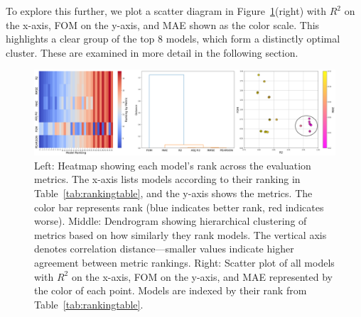 \documentclass[12pt]{article}
\begin{document}
To explore this further, we plot a scatter diagram in Figure~\ref{fig:CV_sidebyside}(right) with \(R^2\) on the x-axis, FOM on the y-axis, and MAE shown as the color scale. This highlights a clear group of the top 8 models, which form a distinctly optimal cluster. These are examined in more detail in the following section.
\begin{figure}[H]
    \centering
    \includegraphics[width=\textwidth]{LatexPlots/CV_plots/ranking_visualisation.png}
    \caption{Left: Heatmap showing each model’s rank across the evaluation metrics. The x-axis lists models according to their ranking in Table~\ref{tab:rankingtable}, and the y-axis shows the metrics. The color bar represents rank (blue indicates better rank, red indicates worse). 
    Middle: Dendrogram showing hierarchical clustering of metrics based on how similarly they rank models. The vertical axis denotes correlation distance—smaller values indicate higher agreement between metric rankings.
    Right: Scatter plot of all models with \(R^2\) on the x-axis, FOM on the y-axis, and MAE represented by the color of each point. Models are indexed by their rank from Table~\ref{tab:rankingtable}.}
    \label{fig:CV_sidebyside}
\end{figure}
\end{document}
